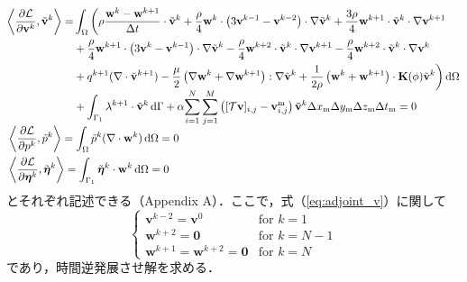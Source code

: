 \documentclass[a4paper,xelatex,ja=standard]{bxjsarticle}
\begin{document}
\begin{align}
    &\begin{aligned}
        \label{eq:adjoint_v}
        \left\langle\frac{\partial \mathcal{L}}{\partial \mathbf{v}^k}, \tilde{\mathbf{v}}^k\right\rangle
        = &\int_{\Omega} \bigg( \rho\frac{\mathbf{w}^{k} - \mathbf{w}^{k+1}}{\Delta t} \cdot \tilde{\mathbf{v}}^k
        + \frac{\rho}{4} \mathbf{w}^{k} \cdot \left( 3\mathbf{v}^{k-1} - \mathbf{v}^{k-2} \right) \cdot \nabla \tilde{\mathbf{v}}^{k}
        + \frac{3\rho}{4} \mathbf{w}^{k+1} \cdot \tilde{\mathbf{v}}^k \cdot \nabla \mathbf{v}^{k+1} \\ 
        &+ \frac{\rho}{4} \mathbf{w}^{k+1} \cdot \left( 3\mathbf{v}^k - \mathbf{v}^{k-1} \right) \cdot \nabla \tilde{\mathbf{v}}^{k}
        - \frac{\rho}{4} \mathbf{w}^{k+2} \cdot \tilde{\mathbf{v}}^{k} \cdot \nabla \mathbf{v}^{k+1} 
        - \frac{\rho}{4}  \mathbf{w}^{k+2} \cdot \tilde{\mathbf{v}}^{k} \cdot \nabla \mathbf{v}^{k} \\
        & +  q^{k+1} (\nabla \cdot \tilde{\mathbf{v}}^{k+1})
        - \frac{\mu}{2} \left(\nabla \mathbf{w}^{k} + \nabla \mathbf{w}^{k+1}\right) : \nabla \tilde{\mathbf{v}}^k
        + \frac{1}{2\rho} \left(\mathbf{w}^{k} + \mathbf{w}^{k+1}\right) \cdot \mathbf{K}(\phi) \tilde{\mathbf{v}}^k 
        \bigg) \, \mathrm{d}\Omega \\
        &+ \int_{\Gamma_1} \lambda^{k+1} \cdot \tilde{\mathbf{v}}^{k} \, \mathrm{d}\Gamma
        + \alpha \smash{\sum_{i=1}^{N} \sum_{j=1}^{M}} \left([\mathcal{T}\mathbf{v}]_{i, j}-\mathbf{v}_{i,j}^{\text{m}}\right)\tilde{\mathbf{v}}^{k} \Delta x_{\text{m}} \Delta y_{\text{m}} \Delta z_{\text{m}} \Delta t_{\text{m}} 
        = 0
    \end{aligned} \\
    \label{eq:adjoint_p} 
    & \left\langle\frac{\partial \mathcal{L}}{\partial p^k}, \tilde{p}^k\right\rangle
    =\int_{\Omega} \tilde{p}^k(\nabla \cdot \mathbf{w}^{k}) \, \mathrm{d}\Omega 
    = 0 \\
    \label{eq:adjoint_eta} 
    &\left\langle\frac{\partial \mathcal{L}}{\partial \boldsymbol{\eta}^k}, \tilde{\boldsymbol{\eta}}^k\right\rangle
    =\int_{\Gamma_1} \tilde{\boldsymbol{\eta}}^k \cdot \mathbf{w}^k \, \mathrm{d}\Omega 
    = 0
\end{align}
とそれぞれ記述できる（Appendix A）．ここで，式（\ref{eq:adjoint_v}）に関して
\begin{equation}
    \begin{cases}
        \displaystyle \mathbf{v}^{k-2} = \mathbf{v}^{0} & \text{for } k=1 \\
        \displaystyle \mathbf{w}^{k+2} = \mathbf{0} & \text{for } k=N-1 \\
        \displaystyle \mathbf{w}^{k+1} = \mathbf{w}^{k+2} = \mathbf{0} & \text{for } k=N
    \end{cases}
\end{equation}
であり，時間逆発展させ解を求める．
\end{document}
